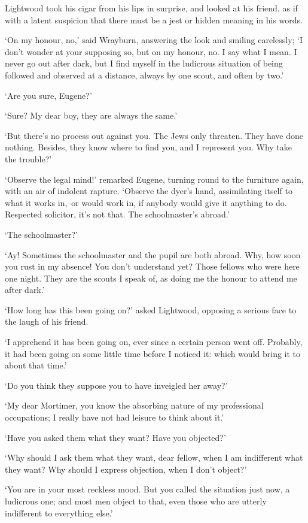 Lightwood took his cigar from his lips in surprise, and looked at his
friend, as if with a latent suspicion that there must be a jest or
hidden meaning in his words.

‘On my honour, no,’ said Wrayburn, answering the look and smiling
carelessly; ‘I don’t wonder at your supposing so, but on my honour, no.
I say what I mean. I never go out after dark, but I find myself in the
ludicrous situation of being followed and observed at a distance, always
by one scout, and often by two.’

‘Are you sure, Eugene?’

‘Sure? My dear boy, they are always the same.’

‘But there’s no process out against you. The Jews only threaten. They
have done nothing. Besides, they know where to find you, and I represent
you. Why take the trouble?’

‘Observe the legal mind!’ remarked Eugene, turning round to the
furniture again, with an air of indolent rapture. ‘Observe the dyer’s
hand, assimilating itself to what it works in,--or would work in, if
anybody would give it anything to do. Respected solicitor, it’s not
that. The schoolmaster’s abroad.’

‘The schoolmaster?’

‘Ay! Sometimes the schoolmaster and the pupil are both abroad. Why, how
soon you rust in my absence! You don’t understand yet? Those fellows
who were here one night. They are the scouts I speak of, as doing me the
honour to attend me after dark.’

‘How long has this been going on?’ asked Lightwood, opposing a serious
face to the laugh of his friend.

‘I apprehend it has been going on, ever since a certain person went off.
Probably, it had been going on some little time before I noticed it:
which would bring it to about that time.’

‘Do you think they suppose you to have inveigled her away?’

‘My dear Mortimer, you know the absorbing nature of my professional
occupations; I really have not had leisure to think about it.’

‘Have you asked them what they want? Have you objected?’

‘Why should I ask them what they want, dear fellow, when I am
indifferent what they want? Why should I express objection, when I don’t
object?’

‘You are in your most reckless mood. But you called the situation just
now, a ludicrous one; and most men object to that, even those who are
utterly indifferent to everything else.’

